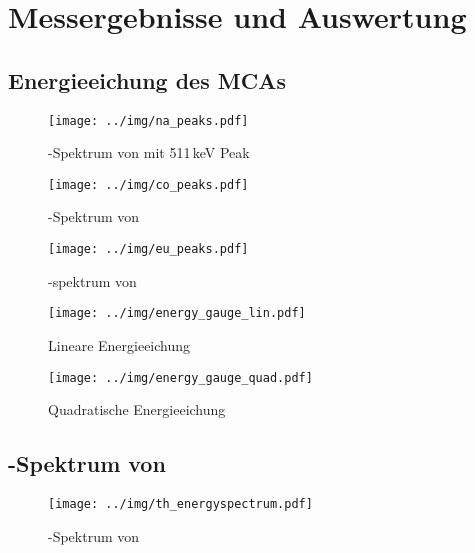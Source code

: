 \section{Messergebnisse und Auswertung}

\subsection{Energieeichung des MCAs}
\begin{figure}[H]
\begin{center}
  \texttt{[image: ../img/na\_peaks.pdf]}
  \caption{\textgamma-Spektrum von  mit 511\,keV Peak}
  \label{img:na:peak}
\end{center}
\end{figure}

\begin{figure}[H]
\begin{center}
  \texttt{[image: ../img/co\_peaks.pdf]}
  \caption{\textgamma-Spektrum von }
  \label{img:co:peak}
\end{center}
\end{figure}

\begin{figure}[H]
\begin{center}
  \texttt{[image: ../img/eu\_peaks.pdf]}
  \caption{\textgamma-spektrum von }
  \label{img:eu:peak}
\end{center}
\end{figure}

\begin{figure}[H]
\begin{center}
  \texttt{[image: ../img/energy\_gauge\_lin.pdf]}
  \caption{Lineare Energieeichung}
  \label{img:gauge:lin}
\end{center}
\end{figure}

\begin{figure}[H]
\begin{center}
  \texttt{[image: ../img/energy\_gauge\_quad.pdf]}
  \caption{Quadratische Energieeichung}
  \label{img:gauge:quad}
\end{center}
\end{figure}

\subsection{\textgamma-Spektrum von }
\begin{figure}[H]
\begin{center}
  \texttt{[image: ../img/th\_energyspectrum.pdf]}
  \caption{\textgamma-Spektrum von }
  \label{img:th:spectrum}
\end{center}
\end{figure}

